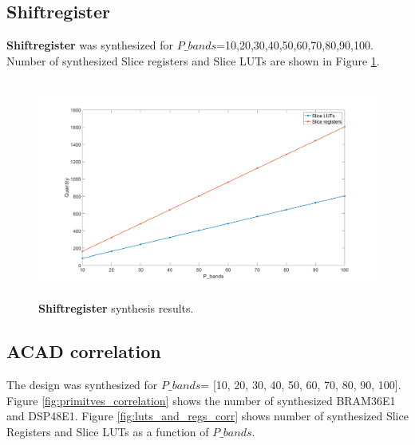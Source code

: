 \subsection{Shiftregister}
\textbf{Shiftregister} was synthesized for $P\_bands$=10,20,30,40,50,60,70,80,90,100. Number of synthesized Slice registers and Slice LUTs are shown in Figure \ref{fig:primitives_shiftregister}. 

\begin{figure}[H]

\hbox{\hspace*{-2cm}                                                           
   \includegraphics[scale=0.3]{images/syntese_resultat/shiftregister.png}}
  \caption{\textbf{Shiftregister} synthesis results.  } 
  \label{fig:primitives_shiftregister}
\end{figure}

\subsection{ACAD correlation}

The design was synthesized for $P\_bands$= [10, 20, 30, 40, 50, 60, 70, 80, 90, 100]. Figure \ref{fig:primitves_correlation}  shows the number of synthesized BRAM36E1 and DSP48E1. Figure \ref{fig:luts_and_regs_corr} shows number of synthesized Slice Registers and Slice LUTs as a function of $P\_bands$.

